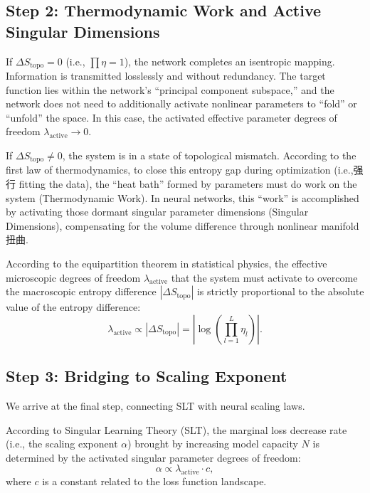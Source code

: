 \documentclass[11pt, a4paper]{article}
\theoremstyle{plain}
\begin{document}
\subsection{Step 2: Thermodynamic Work and Active Singular Dimensions}

If $\Delta S_{\text{topo}} = 0$ (i.e., $\prod\eta = 1$), the network completes an isentropic mapping. Information is transmitted losslessly and without redundancy. The target function lies within the network's ``principal component subspace,'' and the network does not need to additionally activate nonlinear parameters to ``fold'' or ``unfold'' the space. In this case, the activated effective parameter degrees of freedom $\lambda_{\text{active}} \to 0$.

If $\Delta S_{\text{topo}} \neq 0$, the system is in a state of topological mismatch. According to the first law of thermodynamics, to close this entropy gap during optimization (i.e.,强行 fitting the data), the ``heat bath'' formed by parameters must do work on the system (Thermodynamic Work). In neural networks, this ``work'' is accomplished by activating those dormant singular parameter dimensions (Singular Dimensions), compensating for the volume difference through nonlinear manifold扭曲.

According to the equipartition theorem in statistical physics, the effective microscopic degrees of freedom $\lambda_{\text{active}}$ that the system must activate to overcome the macroscopic entropy difference $|\Delta S_{\text{topo}}|$ is strictly proportional to the absolute value of the entropy difference:
\begin{equation}
\lambda_{\text{active}} \propto |\Delta S_{\text{topo}}| = \left| \log\left(\prod_{l=1}^{L} \eta_l\right) \right|.
\label{eq:lambda_active}
\end{equation}

\subsection{Step 3: Bridging to Scaling Exponent}

We arrive at the final step, connecting SLT with neural scaling laws.

According to Singular Learning Theory (SLT), the marginal loss decrease rate (i.e., the scaling exponent $\alpha$) brought by increasing model capacity $N$ is determined by the activated singular parameter degrees of freedom:
\begin{equation}
\alpha \propto \lambda_{\text{active}} \cdot c,
\end{equation}
where $c$ is a constant related to the loss function landscape.
\end{document}
